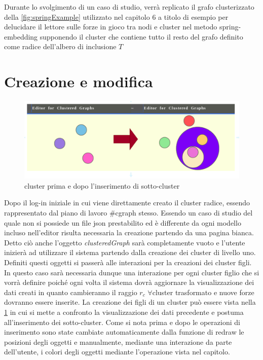 \large
Durante lo svolgimento di un caso di studio, verrà replicato il grafo clusterizzato della \figurename{\ref{fig:springExample}} utilizzato nel capitolo 6 a titolo di esempio per delucidare il lettore sulle forze in gioco tra nodi e cluster nel metodo spring-embedding supponendo il cluster che contiene tutto il resto del grafo definito come radice dell'albero di inclusione $T$

\section{Creazione e modifica}
\begin{figure}[!htb]
	\begin{center}
		\includegraphics[width=1 \linewidth]{figure/prePostEdit}
	\end{center}
	\caption{cluster prima e dopo l'inserimento di sotto-cluster \label{fig:prePostEdit}}
\end{figure}
Dopo il log-in iniziale in cui viene direttamente creato il cluster radice, essendo rappresentato dal piano di lavoro \#cgraph stesso. Essendo un caso di studio del quale non si possiede un file json prestabilito ed è differente da ogni modello incluso nell'editor risulta necessaria la creazione partendo da una pagina bianca. Detto ciò anche l'oggetto \textit{clusteredGraph} sarà completamente vuoto e l'utente inizierà ad utilizzare il sistema partendo dalla creazione dei cluster di livello uno. Definiti questi oggetti si passerà alle interazioni per la creazioni dei cluster figli. In questo caso sarà necessaria dunque una interazione per ogni cluster figlio che si vorrà definire poiché ogni volta il sistema dovrà aggiornare la visualizzazione dei dati creati in quanto cambieranno il raggio $r_c$ $\forall$cluster trasformato e nuove forze dovranno essere inserite. La creazione dei figli di un cluster può essere vista nella \figurename{\ref{fig:prePostEdit}} in cui si mette a confronto la visualizzazione dei dati precedente e postuma all'inserimento dei sotto-cluster. 
Come si nota prima e dopo le operazioni di inserimento sono state cambiate automaticamente dalla funzione di redraw le posizioni degli oggetti e manualmente, mediante una interazione da parte dell'utente, i colori degli oggetti mediante l'operazione vista nel capitolo.
